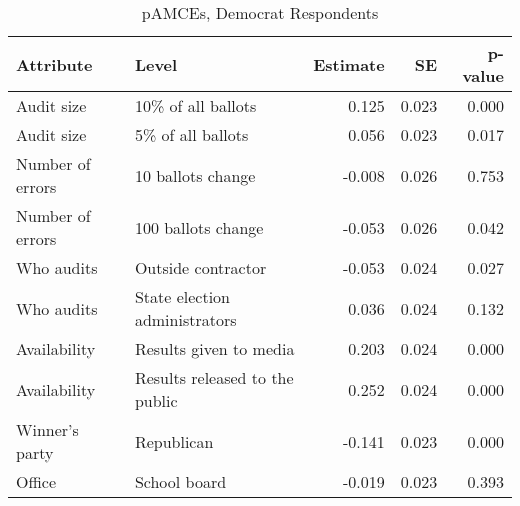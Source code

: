 \begin{table}[!h]

\caption{pAMCEs, Democrat Respondents}
\centering
\begin{tabular}[t]{llrrr}
\toprule
Attribute & Level & Estimate & SE & p-value\\
\midrule
Audit size & 10\% of all ballots & 0.125 & 0.023 & 0.000\\
Audit size & 5\% of all ballots & 0.056 & 0.023 & 0.017\\
Number of errors & 10 ballots change & -0.008 & 0.026 & 0.753\\
Number of errors & 100 ballots change & -0.053 & 0.026 & 0.042\\
Who audits & Outside contractor & -0.053 & 0.024 & 0.027\\
\addlinespace
Who audits & State election administrators & 0.036 & 0.024 & 0.132\\
Availability & Results given to media & 0.203 & 0.024 & 0.000\\
Availability & Results released to the public & 0.252 & 0.024 & 0.000\\
Winner's party & Republican & -0.141 & 0.023 & 0.000\\
Office & School board & -0.019 & 0.023 & 0.393\\
\bottomrule
\end{tabular}
\end{table}

